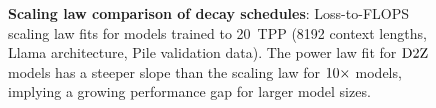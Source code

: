 \begin{figure}
  \centering
  \mbox{}
  \vspace{-2mm}
  \mbox{}
  \caption{\textbf{Scaling law comparison of decay schedules}:
    Loss-to-FLOPS scaling law fits for models trained to 20~TPP (8192
    context lengths, Llama architecture, Pile validation data).  The
    power law fit for $\mbox{D2Z}$ models has a steeper slope than the
    scaling law for $\mbox{10}\times$ models, implying a growing performance gap
    for larger model sizes.\label{fig:pile_scaling}}
\end{figure}
